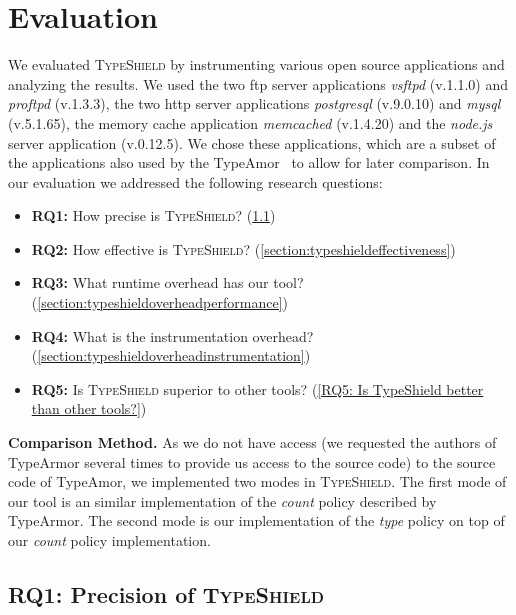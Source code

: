 \section{Evaluation}
\label{chapter:Evaluation}
We evaluated \textsc{TypeShield} by instrumenting various open source applications and analyzing the results. 
We used the two ftp server applications \textit{vsftpd} (v.1.1.0) and \textit{proftpd} (v.1.3.3), the two http server 
applications \textit{postgresql} (v.9.0.10) and \textit{mysql} (v.5.1.65), the memory cache application \textit{memcached} (v.1.4.20) 
and the \textit{node.js} server application (v.0.12.5). We chose these applications, which are a subset of the 
applications also used by the TypeAmor~\cite{veen:typearmor} to allow for later comparison.
In our evaluation we addressed the following research questions:
\begin{itemize}
 \item \textbf{RQ1:} How precise is \textsc{TypeShield}? (\cref{section:typeshieldprecision})
 \item \textbf{RQ2:} How effective is \textsc{TypeShield}? (\cref{section:typeshieldeffectiveness})
 \item \textbf{RQ3:} What runtime overhead has our tool? (\cref{section:typeshieldoverheadperformance})
 \item \textbf{RQ4:} What is the instrumentation overhead? (\cref{section:typeshieldoverheadinstrumentation})
 \item \textbf{RQ5:} Is \textsc{TypeShield} superior to other tools? (\cref{RQ5: Is TypeShield better than other tools?})
\end{itemize}
\textbf{Comparison Method.} As we do not have access (we requested the authors of TypeArmor several times to provide us access to the source code) 
to the source code of TypeAmor, we implemented two modes in \textsc{TypeShield}. 
The first mode of our tool is an similar implementation of the \textit{count} 
policy described by TypeArmor. The second mode is our implementation of the \textit{type} policy on
top of our \textit{count} policy implementation. 
%

\subsection{RQ1: Precision of \textsc{TypeShield}}
\label{section:typeshieldprecision}

